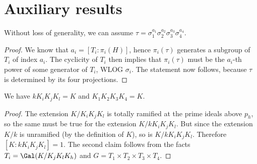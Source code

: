 \section{Auxiliary results}
\begin{lemma}\label{tau}
Without loss of generality, we can assume $\tau=\sigma_1^{a_1}\sigma_2^{a_2}\sigma_3^{a_3}\sigma_4^{a_4}$.
\end{lemma}
\begin{proof}
We know that $a_i=[T_i:\pi_i(H)]$, hence
$\pi_i(\tau)$ generates a subgroup of $T_i$ of index $a_i$. The cyclicity of $T_i$ then implies that $\pi_i(\tau)$ must be the $a_i$-th power of some generator of $T_i$, WLOG $\sigma_i$. The statement now follows, because $\tau$ is determined by its four projections.
\end{proof}

\begin{lemma}\label{comp}
We have $kK_iK_jK_l=K$ and $K_1K_2K_3K_4=K$.
\end{lemma}
\begin{proof}
The extension $K/K_iK_jK_l$ is totally ramified at the prime ideals above $p_h$, so the same must be true for the extension $K/kK_iK_jK_l$. But since the extension $K/k$ is unramified (by the definition of $K$), so is $K/kK_iK_jK_l$. Therefore $[K:kK_iK_jK_l]=1$. The second claim follows from the facts %
$T_i=\Gal(K/K_jK_lK_h)$ and $G=T_1\times T_2\times T_3\times T_4$.
\end{proof}
\begin{center}
\end{center}

